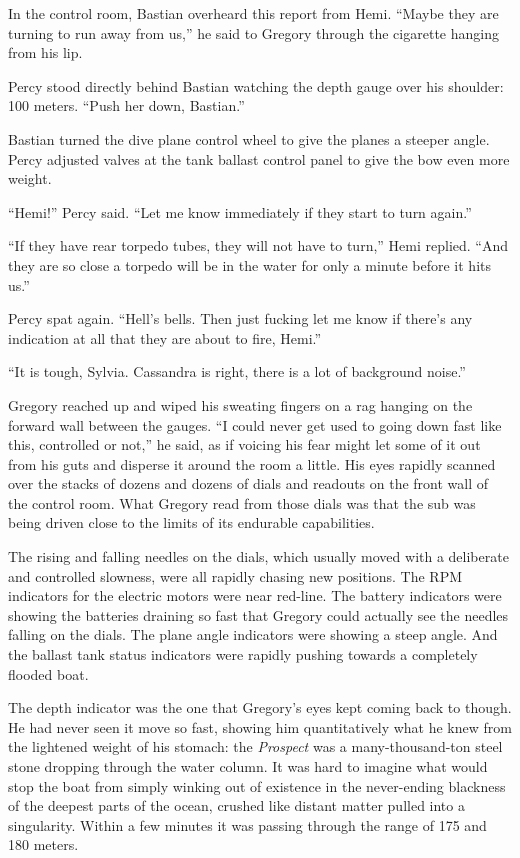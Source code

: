\documentclass[
]{scrbook}
\begin{document}
In the control room, Bastian overheard this report from Hemi. ``Maybe
they are turning to run away from us,'' he said to Gregory through the
cigarette hanging from his lip.

Percy stood directly behind Bastian watching the depth gauge over his
shoulder: 100 meters. ``Push her down, Bastian.''

Bastian turned the dive plane control wheel to give the planes a steeper
angle. Percy adjusted valves at the tank ballast control panel to give
the bow even more weight.

``Hemi!'' Percy said. ``Let me know immediately if they start to turn
again.''

``If they have rear torpedo tubes, they will not have to turn,'' Hemi
replied. ``And they are so close a torpedo will be in the water for only
a minute before it hits us.''

Percy spat again. ``Hell's bells. Then just fucking let me know if
there's any indication at all that they are about to fire, Hemi.''

``It is tough, Sylvia. Cassandra is right, there is a lot of background
noise.''

Gregory reached up and wiped his sweating fingers on a rag hanging on
the forward wall between the gauges. ``I could never get used to going
down fast like this, controlled or not,'' he said, as if voicing his
fear might let some of it out from his guts and disperse it around the
room a little. His eyes rapidly scanned over the stacks of dozens and
dozens of dials and readouts on the front wall of the control room. What
Gregory read from those dials was that the sub was being driven close to
the limits of its endurable capabilities.

The rising and falling needles on the dials, which usually moved with a
deliberate and controlled slowness, were all rapidly chasing new
positions. The RPM indicators for the electric motors were near
red-line. The battery indicators were showing the batteries draining so
fast that Gregory could actually see the needles falling on the dials.
The plane angle indicators were showing a steep angle. And the ballast
tank status indicators were rapidly pushing towards a completely flooded
boat.

The depth indicator was the one that Gregory's eyes kept coming back to
though. He had never seen it move so fast, showing him quantitatively
what he knew from the lightened weight of his stomach: the
\emph{Prospect} was a many-thousand-ton steel stone dropping through the
water column. It was hard to imagine what would stop the boat from
simply winking out of existence in the never-ending blackness of the
deepest parts of the ocean, crushed like distant matter pulled into a
singularity. Within a few minutes it was passing through the range of
175 and 180 meters.
\end{document}
